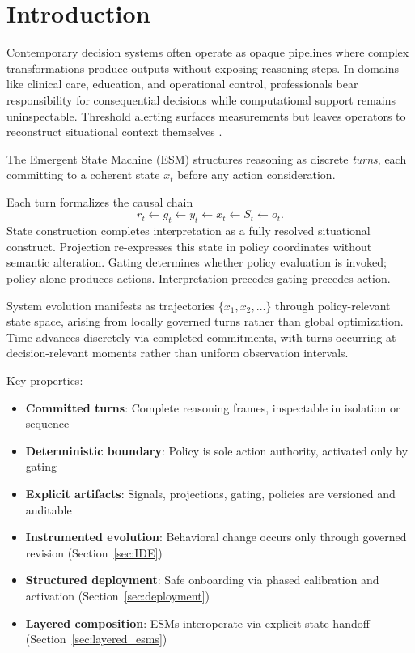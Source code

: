 \documentclass[11pt]{article}
\begin{document}
\section{Introduction}

Contemporary decision systems often operate as opaque pipelines where complex transformations produce outputs without exposing reasoning steps. In domains like clinical care, education, and operational control, professionals bear responsibility for consequential decisions while computational support remains uninspectable. Threshold alerting surfaces measurements but leaves operators to reconstruct situational context themselves \cite{endsley1995}.

The Emergent State Machine (ESM) structures reasoning as discrete \emph{turns}, each committing to a coherent state $x_t$ before any action consideration. 



Each turn formalizes the causal chain
\[
r_t \leftarrow g_t \leftarrow y_t \leftarrow x_t \leftarrow S_t \leftarrow o_t.
\]
State construction completes interpretation as a fully resolved situational construct. Projection re-expresses this state in policy coordinates without semantic alteration. Gating determines whether policy evaluation is invoked; policy alone produces actions. Interpretation precedes gating precedes action.

System evolution manifests as trajectories $\{x_1, x_2, \dots\}$ through policy-relevant state space, arising from locally governed turns rather than global optimization. Time advances discretely via completed commitments, with turns occurring at decision-relevant moments rather than uniform observation intervals.

Key properties:
\begin{itemize}
\item \textbf{Committed turns}: Complete reasoning frames, inspectable in isolation or sequence
\item \textbf{Deterministic boundary}: Policy is sole action authority, activated only by gating
\item \textbf{Explicit artifacts}: Signals, projections, gating, policies are versioned and auditable
\item \textbf{Instrumented evolution}: Behavioral change occurs only through governed revision (Section~\ref{sec:IDE})
\item \textbf{Structured deployment}: Safe onboarding via phased calibration and activation (Section~\ref{sec:deployment})
\item \textbf{Layered composition}: ESMs interoperate via explicit state handoff (Section~\ref{sec:layered_esms})
\end{itemize}
\end{document}
